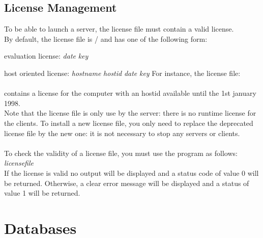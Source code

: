 \subsection{License Management}
To be able to launch a server, the license file must contain
a valid license. \\
By default, the license file is \tdir/  and
has one of the following form:
\be
\item evaluation license:   \emph{date} \emph{key}
\item host oriented license:  \emph{hostname} \emph{hostid} \emph{date} \emph{key}
\ee
For instance, the license file: \\
\\
contains a license for the computer  with an hostid 
available until the 1st january 1998.
\\
Note that the license file is only use by the server: there is no
runtime license for the clients.
To install a new license file, you only need to replace the
deprecated license file by the new one: it is not necessary to
stop any servers or clients.
\\
\\
To check the validity of a license file, you must use the program
 as follows:\\
 \emph{licensefile}\\
If the license is valid no output will be displayed and a status
code of value 0 will be returned.
Otherwise, a clear error message will be displayed and a status of value
1 will be returned.

\section{Databases}

